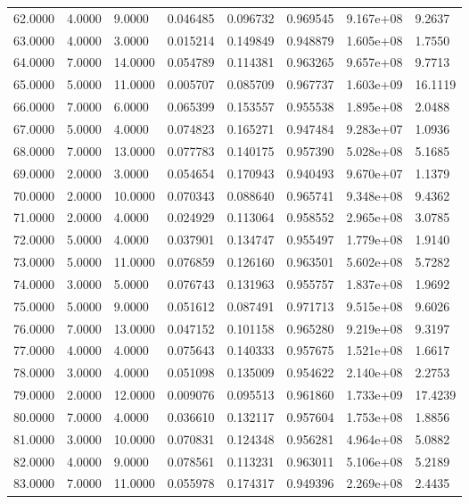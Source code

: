 \documentclass[11pt]{report}
\begin{document}
\begin{longtable}{llllllll}
62.0000 & 4.0000 & 9.0000 & 0.046485 & 0.096732 & 0.969545 & 9.167e+08 & 9.2637 \\
63.0000 & 4.0000 & 3.0000 & 0.015214 & 0.149849 & 0.948879 & 1.605e+08 & 1.7550 \\
64.0000 & 7.0000 & 14.0000 & 0.054789 & 0.114381 & 0.963265 & 9.657e+08 & 9.7713 \\
65.0000 & 5.0000 & 11.0000 & 0.005707 & 0.085709 & 0.967737 & 1.603e+09 & 16.1119 \\
66.0000 & 7.0000 & 6.0000 & 0.065399 & 0.153557 & 0.955538 & 1.895e+08 & 2.0488 \\
67.0000 & 5.0000 & 4.0000 & 0.074823 & 0.165271 & 0.947484 & 9.283e+07 & 1.0936 \\
68.0000 & 7.0000 & 13.0000 & 0.077783 & 0.140175 & 0.957390 & 5.028e+08 & 5.1685 \\
69.0000 & 2.0000 & 3.0000 & 0.054654 & 0.170943 & 0.940493 & 9.670e+07 & 1.1379 \\
70.0000 & 2.0000 & 10.0000 & 0.070343 & 0.088640 & 0.965741 & 9.348e+08 & 9.4362 \\
71.0000 & 2.0000 & 4.0000 & 0.024929 & 0.113064 & 0.958552 & 2.965e+08 & 3.0785 \\
72.0000 & 5.0000 & 4.0000 & 0.037901 & 0.134747 & 0.955497 & 1.779e+08 & 1.9140 \\
73.0000 & 5.0000 & 11.0000 & 0.076859 & 0.126160 & 0.963501 & 5.602e+08 & 5.7282 \\
74.0000 & 3.0000 & 5.0000 & 0.076743 & 0.131963 & 0.955757 & 1.837e+08 & 1.9692 \\
75.0000 & 5.0000 & 9.0000 & 0.051612 & 0.087491 & 0.971713 & 9.515e+08 & 9.6026 \\
76.0000 & 7.0000 & 13.0000 & 0.047152 & 0.101158 & 0.965280 & 9.219e+08 & 9.3197 \\
77.0000 & 4.0000 & 4.0000 & 0.075643 & 0.140333 & 0.957675 & 1.521e+08 & 1.6617 \\
78.0000 & 3.0000 & 4.0000 & 0.051098 & 0.135009 & 0.954622 & 2.140e+08 & 2.2753 \\
79.0000 & 2.0000 & 12.0000 & 0.009076 & 0.095513 & 0.961860 & 1.733e+09 & 17.4239 \\
80.0000 & 7.0000 & 4.0000 & 0.036610 & 0.132117 & 0.957604 & 1.753e+08 & 1.8856 \\
81.0000 & 3.0000 & 10.0000 & 0.070831 & 0.124348 & 0.956281 & 4.964e+08 & 5.0882 \\
82.0000 & 4.0000 & 9.0000 & 0.078561 & 0.113231 & 0.963011 & 5.106e+08 & 5.2189 \\
83.0000 & 7.0000 & 11.0000 & 0.055978 & 0.174317 & 0.949396 & 2.269e+08 & 2.4435 \\

\end{longtable}
\end{document}
